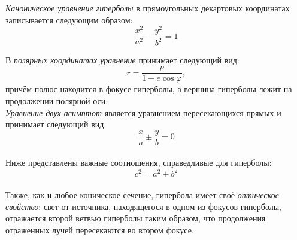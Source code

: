{\itshape Каноническое уравнение гиперболы} в прямоугольных декартовых координатах записывается следующим образом:\begin{equation}
\frac{x^2}{a^2}-\frac{y^2}{b^2}=1
\end{equation}

В {\itshape полярных координатах уравнение} принимает следующий вид:\begin{equation}
r=\frac{p}{1-e\cos\varphi},
\end{equation}
причём полюс находится в фокусе гиперболы, а вершина гиперболы лежит на продолжении полярной оси.\\

{\itshape Уравнение двух асимптот} является уравнением пересекающихся прямых и принимает следующий вид:\begin{equation}
\frac{x}{a}\pm\frac{y}{b}=0
\end{equation}\\

Ниже представлены важные соотношения, справедливые для гиперболы:
\begin{equation}
c^2=a^2+b^2
\end{equation}\\

Также, как и любое коническое сечение, гипербола имеет своё {\itshape оптическое свойство}: свет от источника, находящегося в одном из фокусов гиперболы, отражается второй ветвью гиперболы таким образом, что продолжения отраженных лучей пересекаются во втором фокусе.
